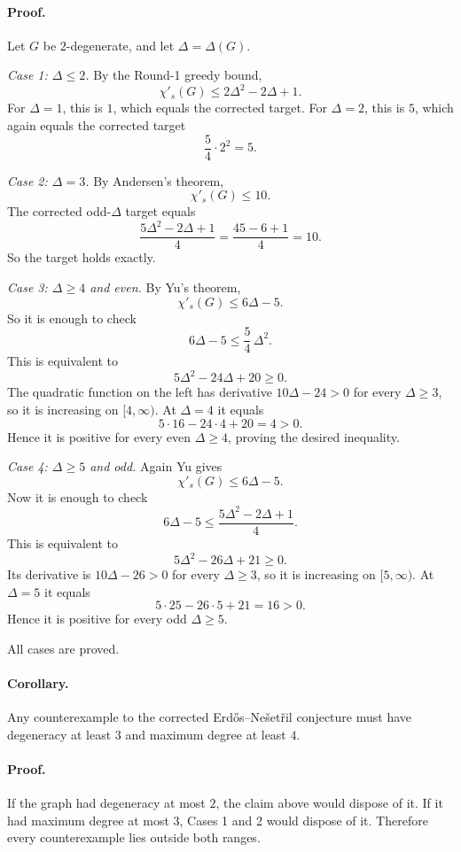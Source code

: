 \paragraph{Proof.}
Let $G$ be $2$-degenerate, and let $\Delta=\Delta(G)$.

\smallskip
\noindent\emph{Case 1: $\Delta\le 2$.}
By the Round-1 greedy bound,
\[
\chi'_s(G)\le 2\Delta^2-2\Delta+1.
\]
For $\Delta=1$, this is $1$, which equals the corrected target.
For $\Delta=2$, this is $5$, which again equals the corrected target
\[
\frac54\cdot 2^2=5.
\]

\smallskip
\noindent\emph{Case 2: $\Delta=3$.}
By Andersen's theorem,
\[
\chi'_s(G)\le 10.
\]
The corrected odd-$\Delta$ target equals
\[
\frac{5\Delta^2-2\Delta+1}{4}
=
\frac{45-6+1}{4}
=10.
\]
So the target holds exactly.

\smallskip
\noindent\emph{Case 3: $\Delta\ge 4$ and even.}
By Yu's theorem,
\[
\chi'_s(G)\le 6\Delta-5.
\]
So it is enough to check
\[
6\Delta-5\le \frac54\,\Delta^2.
\]
This is equivalent to
\[
5\Delta^2-24\Delta+20\ge 0.
\]
The quadratic function on the left has derivative $10\Delta-24>0$ for every $\Delta\ge 3$, so it is increasing on $[4,\infty)$. At $\Delta=4$ it equals
\[
5\cdot 16-24\cdot 4+20=4>0.
\]
Hence it is positive for every even $\Delta\ge 4$, proving the desired inequality.

\smallskip
\noindent\emph{Case 4: $\Delta\ge 5$ and odd.}
Again Yu gives
\[
\chi'_s(G)\le 6\Delta-5.
\]
Now it is enough to check
\[
6\Delta-5\le \frac{5\Delta^2-2\Delta+1}{4}.
\]
This is equivalent to
\[
5\Delta^2-26\Delta+21\ge 0.
\]
Its derivative is $10\Delta-26>0$ for every $\Delta\ge 3$, so it is increasing on $[5,\infty)$. At $\Delta=5$ it equals
\[
5\cdot 25-26\cdot 5+21=16>0.
\]
Hence it is positive for every odd $\Delta\ge 5$.

All cases are proved.


\paragraph{Corollary.}
Any counterexample to the corrected Erd\H{o}s--Ne\v{s}et\v{r}il conjecture must have degeneracy at least $3$ and maximum degree at least $4$.

\paragraph{Proof.}
If the graph had degeneracy at most $2$, the claim above would dispose of it. If it had maximum degree at most $3$, Cases 1 and 2 would dispose of it. Therefore every counterexample lies outside both ranges.



